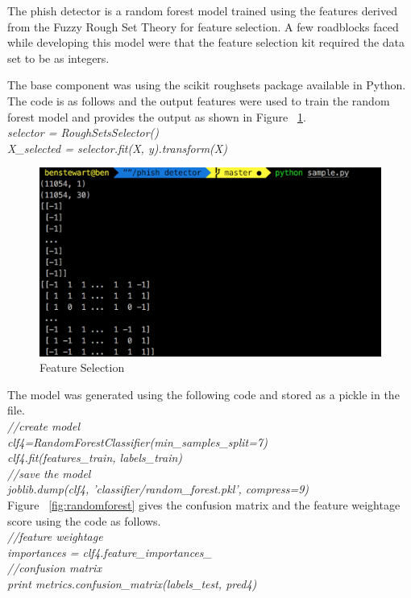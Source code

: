 The phish detector is a random forest model trained using the features derived from the Fuzzy Rough Set Theory for feature selection. A few roadblocks faced while developing this model were that the feature selection kit required the data set to be as integers.

The base component was using the scikit roughsets package available in Python. The code is as follows and the output features were used to train the random forest model and provides the output as shown in Figure ~\ref{fig:featureselection}.\\
\null\quad\textit{selector = RoughSetsSelector()}\\
\null\quad\textit{X\_selected = selector.fit(X, y).transform(X)}\\

\begin{figure}[htp]
\centering
\includegraphics[scale=0.5]{Figures/image16.png}
\caption{Feature Selection}
\label{fig:featureselection}
\end{figure}

The model was generated using the following code and stored as a pickle in the file.\\
\null\quad\textit{//create model}\\
\null\quad\textit{clf4=RandomForestClassifier(min\_samples\_split=7)}\\
\null\quad\textit{clf4.fit(features\_train, labels\_train)}\\
\null\quad\textit{//save the model}\\
\null\quad\textit{joblib.dump(clf4, 'classifier/random\_forest.pkl', compress=9)}\\

Figure  ~\ref{fig:randomforest} gives the confusion matrix and the feature weightage score using the code as follows.\\
\null\quad\textit{//feature weightage}\\
\null\quad\textit{importances = clf4.feature\_importances\_}\\
\null\quad\textit{//confusion matrix}\\
\null\quad\textit{print metrics.confusion\_matrix(labels\_test, pred4)}\\

